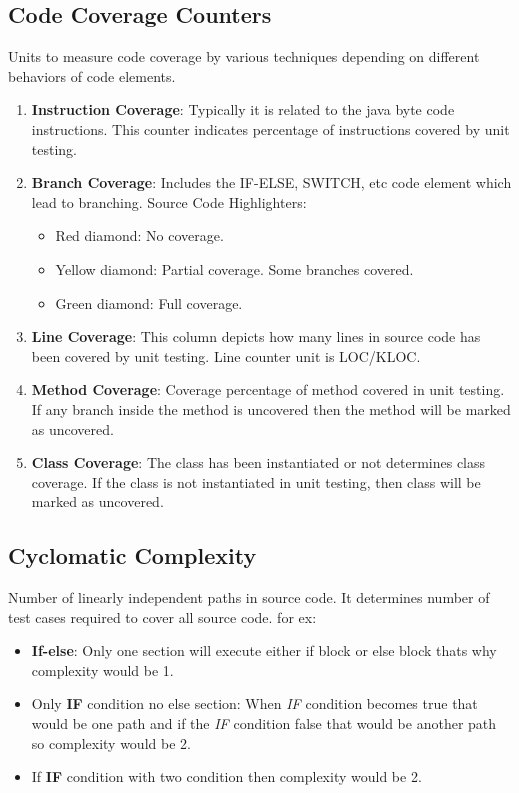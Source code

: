 \documentclass[a4paper,oneside,1,english1pt]{report}
\begin{document}
		\subsection{Code Coverage Counters}
		\par Units to measure code coverage by  various techniques depending on different behaviors of code elements.
		\begin{enumerate}
			\item {\textbf{Instruction Coverage}:
				Typically it is related to the java byte code instructions. This counter indicates percentage of instructions covered by unit testing.
				}
			\item {\textbf{Branch Coverage}:
				 Includes the IF-ELSE, SWITCH, etc code element which lead to branching.
				 Source Code Highlighters:
				 
				 \begin{itemize}
				 	\item Red diamond: No coverage.
				 	\item Yellow diamond: Partial coverage. Some branches covered.
				 	\item Green diamond: Full coverage.
				 \end{itemize}
				}
			\item {\textbf{Line Coverage}:
				This column depicts how many lines in source code has been covered by  unit testing. Line counter unit is \ac{LOC}/\ac{KLOC}.
				}
			\item {\textbf{Method Coverage}:
					Coverage percentage of method covered in unit testing. If any branch inside the method is uncovered then the method will be marked as uncovered.
				}
			\item {\textbf{Class Coverage}:
				The class has been instantiated or not determines class coverage. If the class is not instantiated in unit testing, then class will be marked as uncovered.
				}
		\end{enumerate}
	
		\subsection{Cyclomatic Complexity}
		Number of linearly independent paths in source code. It determines number of test cases required to cover all source code.
		for ex:
		\begin{itemize}
			\item \textbf{If-else}: Only one section will execute either if block or else block thats why complexity would be 1.
			\item Only \textbf{IF} condition no else section: When \textit{IF} condition becomes true that would be one path and if the \textit{IF} condition false that would be another path so complexity would be 2.
			\item If \textbf{IF} condition with two condition then complexity would be 2.
		\end{itemize}
\end{document}
